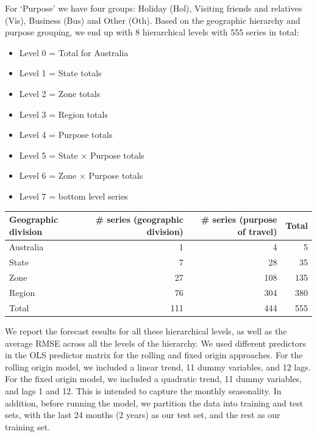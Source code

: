 \documentclass[11pt,a4paper,]{article}
\providecommand{\tightlist}{%
  \setlength{\itemsep}{0pt}\setlength{\parskip}{0pt}}
\let\origtable\table
\let\endorigtable\endtable
\renewenvironment{table}[1][2] {
    \expandafter\origtable\expandafter[!htbp]
} {
    \endorigtable
}
\begin{document}
For `Purpose' we have four groups: Holiday (Hol), Visiting friends and
relatives (Vis), Business (Bus) and Other (Oth). Based on the geographic
hierarchy and purpose grouping, we end up with 8 hierarchical levels
with 555 series in total:

\begin{itemize}
\tightlist
\item
  Level 0 = Total for Australia
\item
  Level 1 = State totals
\item
  Level 2 = Zone totals
\item
  Level 3 = Region totals
\item
  Level 4 = Purpose totals
\item
  Level 5 = State \(\times\) Purpose totals
\item
  Level 6 = Zone \(\times\) Purpose totals
\item
  Level 7 = bottom level series
\end{itemize}

\begin{table}[!h]

\caption{\label{tab:Australiageographicalpurposedivision}Number of Australian domestic tourism series in each level of the hierarchy and group structure.}
\centering
\begin{tabular}{lrrr}
\toprule
Geographic division & \# series (geographic division) & \# series (purpose of travel) & Total\\
\midrule
Australia & 1 & 4 & 5\\
State & 7 & 28 & 35\\
Zone & 27 & 108 & 135\\
Region & 76 & 304 & 380\\
\hline
Total & 111 & 444 & 555\\
\bottomrule
\end{tabular}
\end{table}

We report the forecast results for all these hierarchical levels, as
well as the average RMSE across all the levels of the hierarchy. We used
different predictors in the OLS predictor matrix for the rolling and
fixed origin approaches. For the rolling origin model, we included a
linear trend, 11 dummy variables, and 12 lags. For the fixed origin
model, we included a quadratic trend, 11 dummy variables, and lags 1 and
12. This is intended to capture the monthly seasonality. In addition,
before running the model, we partition the data into training and test
sets, with the last 24 months (2 years) as our test set, and the rest as
our training set.
\end{document}
